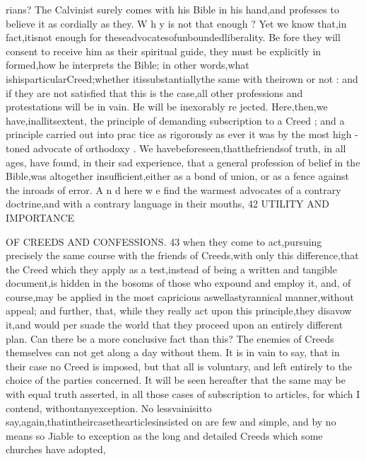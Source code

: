 \documentclass[
]{book}
\begin{document}
rians? The Calvinist surely comes with his Bible in his hand,and professes to believe it as cordially as they. W h y is not that enough ?
Yet we know that,in fact,itisnot enough for theseadvocatesofunboundedliberality. Be fore they will consent to receive him as their spiritual guide, they must be explicitly in formed,how he interprets the Bible; in other words,what ishisparticularCreed;whether itissubstantiallythe same with theirown or not : and if they are not satisfied that this is
the case,all other professions and protestations will be in vain. He will be inexorably re
jected. Here,then,we have,inallitsextent, the principle of demanding subscription to a Creed ; and a principle carried out into prac
tice as rigorously as ever it was by the most high -toned advocate of orthodoxy .
We havebeforeseen,thatthefriendsof truth, in all ages, have found, in their sad
experience, that a general profession of belief in the Bible,was altogether insufficient,either
as a bond of union, or as a fence against the inroads of error. A n d here w e find the
warmest advocates of a contrary doctrine,and with a contrary language in their mouths,
42 UTILITY AND IMPORTANCE

OF CREEDS AND CONFESSIONS. 43
when they come to act,pursuing precisely the same course with the friends of Creeds,with
only this difference,that the Creed which they apply as a test,instead of being a written and tangible document,is hidden in the bosoms of
those who expound and employ it, and, of
course,may be applied in the most capricious
aswellastyrannical manner,without appeal;
and further, that, while they really act upon
this principle,they disavow it,and would per suade the world that they proceed upon an
entirely different plan.
Can there be a more conclusive fact than
this? The enemies of Creeds themselves can
not get along a day without them. It is in
vain to say, that in their case no Creed is
imposed, but that all is voluntary, and left
entirely to the choice of the parties concerned. It will be seen hereafter that the same may be
with equal truth asserted, in all those cases of subscription to articles, for which I contend,
withoutanyexception. No lessvainisitto say,again,thatintheircasethearticlesinsisted on are few and simple, and by no means so
Jiable to exception as the long and detailed Creeds which some churches have adopted,
\end{document}
